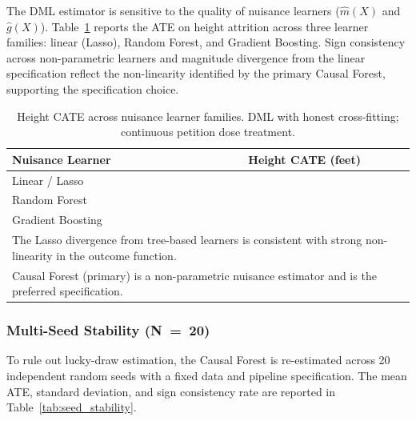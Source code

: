 \documentclass[11pt, letterpaper, oneside]{article}
\begin{document}
The DML estimator is sensitive to the quality of nuisance learners ($\hat{m}(X)$ and $\hat{g}(X)$). Table~\ref{tab:nuisance_sensitivity} reports the ATE on height attrition across three learner families: linear (Lasso), Random Forest, and Gradient Boosting. Sign consistency across non-parametric learners and magnitude divergence from the linear specification reflect the non-linearity identified by the primary Causal Forest, supporting the specification choice.

\begin{table}[!htbp]
\centering
\caption[Nuisance Model Sensitivity (Height CATE)]{Height CATE across nuisance learner families. DML with honest cross-fitting; continuous petition dose treatment.}
\label{tab:nuisance_sensitivity}
\begin{tabular}{lc}
\toprule
\textbf{Nuisance Learner} & \textbf{Height CATE (feet)} \\
\midrule
Linear / Lasso    & \metricRobustNuisanceLasso{} \\
Random Forest     & \metricRobustNuisanceRF{} \\
Gradient Boosting & \metricRobustNuisanceGBM{} \\
\bottomrule
\multicolumn{2}{l}{\footnotesize The Lasso divergence from tree-based learners is consistent with strong non-linearity in the outcome function.} \\
\multicolumn{2}{l}{\footnotesize Causal Forest (primary) is a non-parametric nuisance estimator and is the preferred specification.} \\
\end{tabular}
\end{table}

\subsubsection{Multi-Seed Stability (N~=~20)}

To rule out lucky-draw estimation, the Causal Forest is re-estimated across 20 independent random seeds with a fixed data and pipeline specification. The mean ATE, standard deviation, and sign consistency rate are reported in Table~\ref{tab:seed_stability}.
\end{document}

